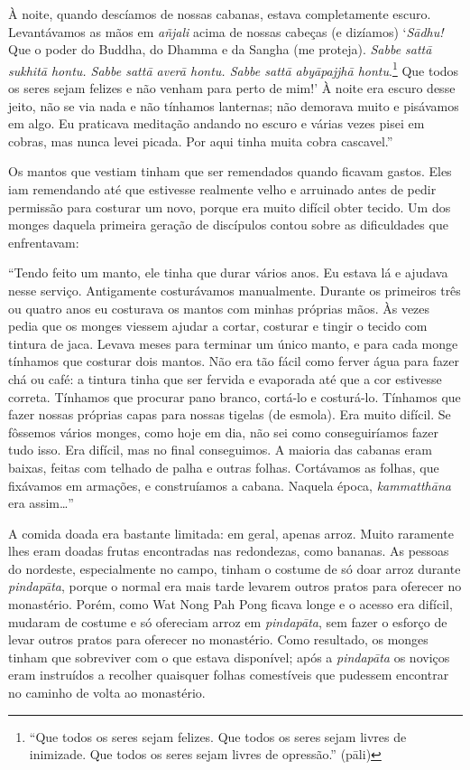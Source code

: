 À noite, quando descíamos de nossas cabanas, estava completamente
escuro. Levantávamos as mãos em \emph{añjali} acima de nossas cabeças (e
dizíamos) `\emph{Sādhu!} Que o poder do Buddha, do Dhamma e da Sangha
(me proteja). \emph{Sabbe sattā sukhitā hontu. Sabbe sattā averā hontu.
Sabbe sattā abyāpajjhā hontu}.\footnote{``Que todos os seres sejam
  felizes. Que todos os seres sejam livres de inimizade. Que todos os
  seres sejam livres de opressão.'' (pāli)} Que todos os seres
sejam felizes e não venham para perto de mim!' À noite era escuro desse
jeito, não se via nada e não tínhamos lanternas; não demorava muito e
pisávamos em algo. Eu praticava meditação andando no escuro e várias
vezes pisei em cobras, mas nunca levei picada. Por aqui tinha muita
cobra cascavel.''

Os mantos que vestiam tinham que ser remendados quando ficavam gastos.
Eles iam remendando até que estivesse realmente velho e arruinado antes
de pedir permissão para costurar um novo, porque era muito difícil obter
tecido. Um dos monges daquela primeira geração de discípulos contou
sobre as dificuldades que enfrentavam:

``Tendo feito um manto, ele tinha que durar vários anos. Eu estava lá e
ajudava nesse serviço. Antigamente costurávamos manualmente. Durante os
primeiros três ou quatro anos eu costurava os mantos com minhas próprias
mãos. Às vezes pedia que os monges viessem ajudar a cortar, costurar e
tingir o tecido com tintura de jaca. Levava meses para terminar um único
manto, e para cada monge tínhamos que costurar dois mantos. Não era tão
fácil como ferver água para fazer chá ou café: a tintura tinha que ser
fervida e evaporada até que a cor estivesse correta. Tínhamos que
procurar pano branco, cortá-lo e costurá-lo. Tínhamos que fazer nossas
próprias capas para nossas tigelas (de esmola). Era muito difícil. Se
fôssemos vários monges, como hoje em dia, não sei como conseguiríamos
fazer tudo isso. Era difícil, mas no final conseguimos. A maioria das
cabanas eram baixas, feitas com telhado de palha e outras folhas.
Cortávamos as folhas, que fixávamos em armações, e construíamos a
cabana. Naquela época, \emph{kammatthāna} era assim\ldots{}''

A comida doada era bastante limitada: em geral, apenas arroz. Muito
raramente lhes eram doadas frutas encontradas nas redondezas, como
bananas. As pessoas do nordeste, especialmente no campo, tinham o
costume de só doar arroz durante \emph{pindapāta}, porque o normal era
mais tarde levarem outros pratos para oferecer no monastério. Porém,
como Wat Nong Pah Pong ficava longe e o acesso era difícil, mudaram de
costume e só ofereciam arroz em \emph{pindapāta}, sem fazer o esforço de
levar outros pratos para oferecer no monastério. Como resultado, os
monges tinham que sobreviver com o que estava disponível; após a
\emph{pindapāta} os noviços eram instruídos a recolher quaisquer folhas
comestíveis que pudessem encontrar no caminho de volta ao monastério.

